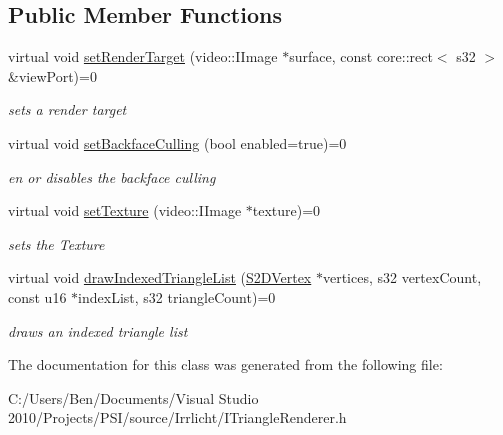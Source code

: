 \subsection*{Public Member Functions}
\begin{DoxyCompactItemize}
\item 
\hypertarget{classirr_1_1video_1_1_i_triangle_renderer_a8acf429b18efa7afb48891811c06ef02}{virtual void \hyperlink{classirr_1_1video_1_1_i_triangle_renderer_a8acf429b18efa7afb48891811c06ef02}{set\-Render\-Target} (video\-::\-I\-Image $\ast$surface, const core\-::rect$<$ s32 $>$ \&view\-Port)=0}\label{classirr_1_1video_1_1_i_triangle_renderer_a8acf429b18efa7afb48891811c06ef02}

\begin{DoxyCompactList}\small\item\em sets a render target \end{DoxyCompactList}\item 
\hypertarget{classirr_1_1video_1_1_i_triangle_renderer_ab4e37a5c18f68eca7c451fa10bf743ec}{virtual void \hyperlink{classirr_1_1video_1_1_i_triangle_renderer_ab4e37a5c18f68eca7c451fa10bf743ec}{set\-Backface\-Culling} (bool enabled=true)=0}\label{classirr_1_1video_1_1_i_triangle_renderer_ab4e37a5c18f68eca7c451fa10bf743ec}

\begin{DoxyCompactList}\small\item\em en or disables the backface culling \end{DoxyCompactList}\item 
\hypertarget{classirr_1_1video_1_1_i_triangle_renderer_ab137634ad572835b45141781bcf64bb1}{virtual void \hyperlink{classirr_1_1video_1_1_i_triangle_renderer_ab137634ad572835b45141781bcf64bb1}{set\-Texture} (video\-::\-I\-Image $\ast$texture)=0}\label{classirr_1_1video_1_1_i_triangle_renderer_ab137634ad572835b45141781bcf64bb1}

\begin{DoxyCompactList}\small\item\em sets the Texture \end{DoxyCompactList}\item 
\hypertarget{classirr_1_1video_1_1_i_triangle_renderer_aa567afa1fa211b8df7b8eecd39f4e756}{virtual void \hyperlink{classirr_1_1video_1_1_i_triangle_renderer_aa567afa1fa211b8df7b8eecd39f4e756}{draw\-Indexed\-Triangle\-List} (\hyperlink{structirr_1_1video_1_1_s2_d_vertex}{S2\-D\-Vertex} $\ast$vertices, s32 vertex\-Count, const u16 $\ast$index\-List, s32 triangle\-Count)=0}\label{classirr_1_1video_1_1_i_triangle_renderer_aa567afa1fa211b8df7b8eecd39f4e756}

\begin{DoxyCompactList}\small\item\em draws an indexed triangle list \end{DoxyCompactList}\end{DoxyCompactItemize}


The documentation for this class was generated from the following file\-:\begin{DoxyCompactItemize}
\item 
C\-:/\-Users/\-Ben/\-Documents/\-Visual Studio 2010/\-Projects/\-P\-S\-I/source/\-Irrlicht/I\-Triangle\-Renderer.\-h\end{DoxyCompactItemize}
